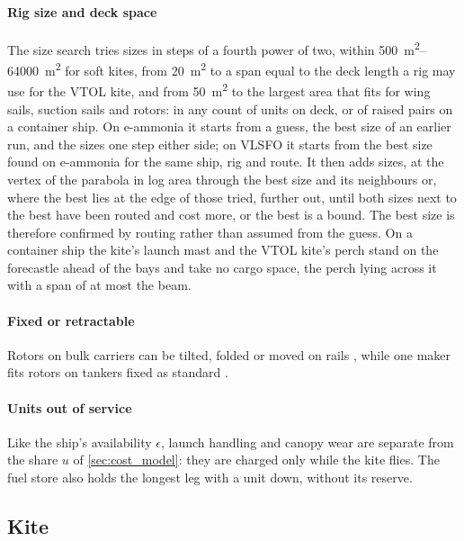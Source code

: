 \paragraph{Rig size and deck space} The size search tries sizes in steps of a fourth power of two, within \SIrange{500}{64000}{m^2} for soft kites, from \SI{20}{m^2} to a span equal to the deck length a rig may use for the VTOL kite, and from \SI{50}{m^2} to the largest area that fits for wing sails, suction sails and rotors: in any count of units on deck, or of raised pairs on a container ship. On e-ammonia it starts from a guess, the best size of an earlier run, and the sizes one step either side; on VLSFO it starts from the best size found on e-ammonia for the same ship, rig and route. It then adds sizes, at the vertex of the parabola in log area through the best size and its neighbours or, where the best lies at the edge of those tried, further out, until both sizes next to the best have been routed and cost more, or the best is a bound. The best size is therefore confirmed by routing rather than assumed from the guess. On a container ship the kite's launch mast and the VTOL kite's perch stand on the forecastle ahead of the bays and take no cargo space, the perch lying across it with a span of at most the beam.

\paragraph{Fixed or retractable} Rotors on bulk carriers can be tilted, folded or moved on rails \citep{gcaptain2021seazhoushan,maritimeexecutive2024sohar,anemoi2026}, while one maker fits rotors on tankers fixed as standard \citep{anemoi_deploy}.

\paragraph{Units out of service} Like the ship's availability $\epsilon$, launch handling and canopy wear are separate from the share $u$ of \cref{sec:cost_model}: they are charged only while the kite flies. The fuel store also holds the longest leg with a unit down, without its reserve.

\subsection{Kite}
\label{sec:det_kite}

